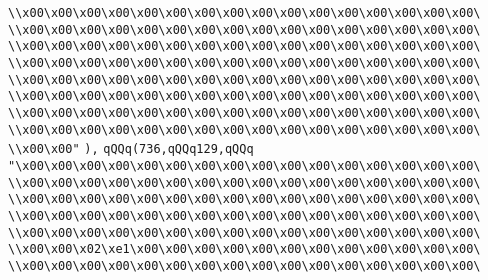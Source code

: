 \verb|\\x00\x00\x00\x00\x00\x00\x00\x00\x00\x00\x00\x00\x00\x00\x00\x00\|\newline
\verb|\\x00\x00\x00\x00\x00\x00\x00\x00\x00\x00\x00\x00\x00\x00\x00\x00\|\newline
\verb|\\x00\x00\x00\x00\x00\x00\x00\x00\x00\x00\x00\x00\x00\x00\x00\x00\|\newline
\verb|\\x00\x00\x00\x00\x00\x00\x00\x00\x00\x00\x00\x00\x00\x00\x00\x00\|\newline
\verb|\\x00\x00\x00\x00\x00\x00\x00\x00\x00\x00\x00\x00\x00\x00\x00\x00\|\newline
\verb|\\x00\x00\x00\x00\x00\x00\x00\x00\x00\x00\x00\x00\x00\x00\x00\x00\|\newline
\verb|\\x00\x00\x00\x00\x00\x00\x00\x00\x00\x00\x00\x00\x00\x00\x00\x00\|\newline
\verb|\\x00\x00\x00\x00\x00\x00\x00\x00\x00\x00\x00\x00\x00\x00\x00\x00\|\newline
\verb|\\x00\x00"|\newline
\verb|),|\newline
\verb|qQQq(736,qQQq129,qQQq|\newline
\verb|"\x00\x00\x00\x00\x00\x00\x00\x00\x00\x00\x00\x00\x00\x00\x00\x00\|\newline
\verb|\\x00\x00\x00\x00\x00\x00\x00\x00\x00\x00\x00\x00\x00\x00\x00\x00\|\newline
\verb|\\x00\x00\x00\x00\x00\x00\x00\x00\x00\x00\x00\x00\x00\x00\x00\x00\|\newline
\verb|\\x00\x00\x00\x00\x00\x00\x00\x00\x00\x00\x00\x00\x00\x00\x00\x00\|\newline
\verb|\\x00\x00\x00\x00\x00\x00\x00\x00\x00\x00\x00\x00\x00\x00\x00\x00\|\newline
\verb|\\x00\x00\x02\xe1\x00\x00\x00\x00\x00\x00\x00\x00\x00\x00\x00\x00\|\newline
\verb|\\x00\x00\x00\x00\x00\x00\x00\x00\x00\x00\x00\x00\x00\x00\x00\x00\|\newline
